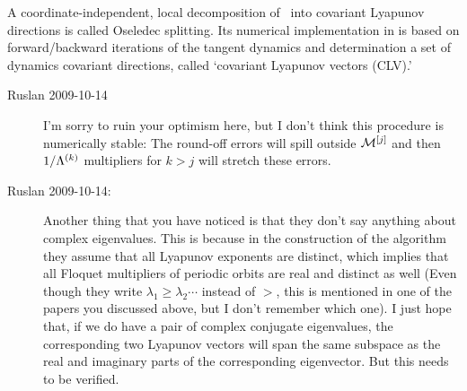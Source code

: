 A coordinate-independent, local decomposition of \statesp\
into covariant Lyapunov directions is called Oseledec
splitting.
Its numerical implementation in 
is based on forward/backward
iterations of the tangent dynamics and determination
a set of dynamics covariant directions,
called `covariant Lyapunov vectors (CLV).'

\begin{description}
  \item[Ruslan 2009-10-14] I'm sorry to ruin your
optimism here, but I don't think this procedure is
numerically stable: The round-off errors will spill outside
${\cal M}^{[j]}$ and then $1/\Lambda^{(k)}$ multipliers for $k >
j$ will stretch these errors.


  \item[Ruslan 2009-10-14:]
Another thing that you have noticed is that they don't say
anything about complex eigenvalues.  This is because in the
construction of the algorithm they assume that all Lyapunov
exponents are distinct, which implies that all Floquet
multipliers of periodic orbits are real and distinct as well
(Even though they write $\lambda_1 \geq \lambda_2 \cdots$
instead of $>$, this is mentioned in one of the papers you
discussed above, but I don't remember which one).  I just
hope that, if we do have a pair of complex conjugate
eigenvalues, the corresponding two Lyapunov vectors will span
the same subspace as the real and imaginary parts of the
corresponding eigenvector.  But this needs to be verified.




\end{description}
